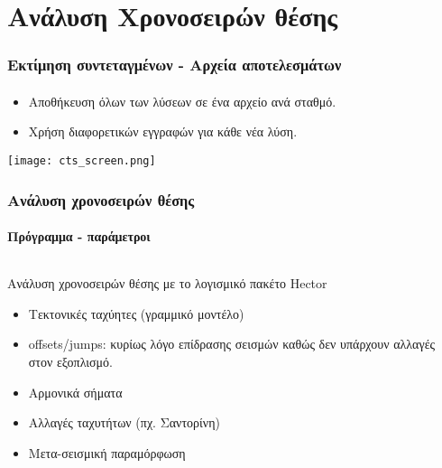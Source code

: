 \section{Ανάλυση Χρονοσειρών θέσης}
 
\graphicspath{{Chapter2/Figs/}}

\begin{frame}
  \frametitle{Εκτίμηση συντεταγμένων - Αρχεία αποτελεσμάτων}
  \framesubtitle{}
  \label{}
  \begin{itemize}\setlength\itemsep{1em}
    \item Αποθήκευση όλων των λύσεων σε ένα αρχείο ανά σταθμό.
    \item Χρήση διαφορετικών εγγραφών για κάθε νέα λύση.
  \end{itemize}
  \begin{center}
    \texttt{[image: cts\_screen.png]}
  \end{center}
\end{frame}
\note{}

\begin{frame}
  \frametitle{Ανάλυση χρονοσειρών θέσης}
  \framesubtitle{Πρόγραμμα - παράμετροι}
  \label{}
  \begin{columns}[T]
    \begin{column}{.5\textwidth}
      Ανάλυση χρονοσειρών θέσης με το λογισμικό πακέτο Hector \citep{Bos2012}
      \begin{itemize}\setlength\itemsep{1em}
        \item Τεκτονικές ταχύητες (γραμμικό μοντέλο)
        \item offsets/jumps: κυρίως λόγο επίδρασης σεισμών καθώς δεν υπάρχουν αλλαγές στον εξοπλισμό.
        \item Αρμονικά σήματα
        \item Αλλαγές ταχυτήτων (πχ. Σαντορίνη)
        \item Μετα-σεισμική παραμόρφωση
      \end{itemize}
    \end{column}
  \end{columns}
\end{frame}
\note{}


